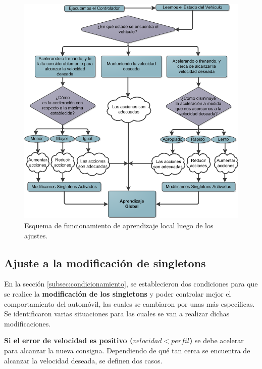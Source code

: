 \begin{figure}[htb]
\centering
\includegraphics[width=0.85\linewidth,height = 10 cm]{figures/EsquemaAjustes.png}
\caption{Esquema de funcionamiento de aprendizaje local luego de los ajustes.}
\label{fig:esquemaA}
\end{figure}

\subsection{Ajuste a la modificación de singletons}
\label{subsec:ajusteS}


En la sección \ref{subsec:condicionamiento}, se establecieron dos condiciones para que se realice la \textbf{modificación de los singletons} y poder controlar mejor el comportamiento del automóvil, las cuales se cambiaron por unas más específicas. Se identificaron varias situaciones para las cuales se van a realizar dichas modificaciones.

\textbf{Si el error de velocidad es positivo ($velocidad<perfil$)} se debe acelerar para alcanzar la nueva consigna. Dependiendo de qué tan cerca se encuentra de alcanzar la velocidad deseada, se definen dos casos.

